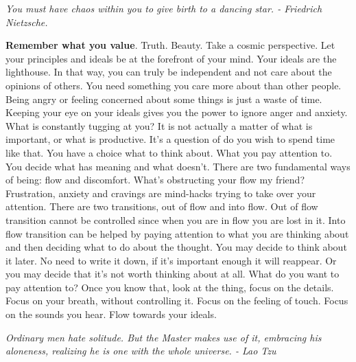 \documentclass[a4paper,hidelinks]{article}
\begin{document}

\begin{center}
\textit{You must have chaos within you to give birth to a dancing star. - Friedrich Nietzsche.}
\end{center}

\textbf{Remember what you value}.
Truth.
Beauty.
Take a cosmic perspective.
Let your principles and ideals be at the forefront of your mind.
Your ideals are the lighthouse.
In that way, you can truly be independent and not care about the opinions of others.
You need something you care more about than other people.
Being angry or feeling concerned about some things is just a waste of time.
Keeping your eye on your ideals gives you the power to ignore anger and anxiety.
What is constantly tugging at you?
It is not actually a matter of what is important, or what is productive.
It's a question of do you wish to spend time like that.
You have a choice what to think about.
What you pay attention to.
You decide what has meaning and what doesn’t.
There are two fundamental ways of being: flow and discomfort.
What's obstructing your flow my friend?
Frustration, anxiety and cravings are mind-hacks trying to take over your attention.
There are two transitions, out of flow and into flow.
Out of flow transition cannot be controlled since when you are in flow you are lost in it.
Into flow transition can be helped by paying attention to what you are thinking about and then deciding what to do about the thought.
You may decide to think about it later.
No need to write it down, if it's important enough it will reappear.
Or you may decide that it's not worth thinking about at all.
What do you want to pay attention to?
Once you know that, look at the thing, focus on the details.
Focus on your breath, without controlling it.
Focus on the feeling of touch.
Focus on the sounds you hear.
Flow towards your ideals.

\newpage

\begin{center}
\textit{Ordinary men hate solitude. But the Master makes use of it, embracing his aloneness, realizing he is one with the whole universe. - Lao Tzu}
\end{center}
\end{document}
